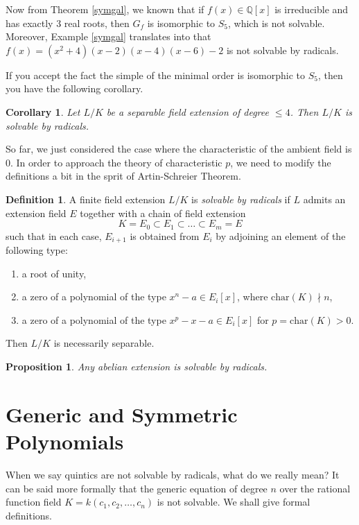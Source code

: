 \documentclass[12pt]{report}
\newtheorem{corollary}[theorem]{Corollary}
\newtheorem{proposition}[theorem]{Proposition}
{\theoremstyle{remark}\newtheorem*{remark}{Remark}}
\theoremstyle{definition}
\newtheorem{definition}[theorem]{Definition}
\newcommand{\qq}{\mathbb{Q}}
\newcommand{\charr}{\text{char}}
\begin{document}
Now from Theorem \ref{symgal}, we known that if $f(x)\in \qq[x]$ is irreducible and has exactly 3 real roots, then $G_f$ is isomorphic to $S_5$, which is not solvable. Moreover, Example \ref{symgal} translates into that $f(x)=(x^2+4)(x-2)(x-4)(x-6)-2$ is not solvable by radicals.

If you accept the fact the simple of the minimal order is isomorphic to $S_5$, then you have the following corollary.

\begin{corollary}
	Let $L/K$ be a separable field extension of degree $\leq 4$. Then $L/K$ is solvable by radicals.
\end{corollary}

So far, we just considered the case where the characteristic of the ambient field is 0. In order to approach the theory of characteristic $p$, we need to modify the definitions a bit in the sprit of Artin-Schreier Theorem.

\begin{definition}
	A finite field extension $L/K$ is \emph{solvable by radicals} if $L$ admits an extension field $E$ together with a chain of field extension
	\[K=E_0\subset E_1\subset \dots\subset E_m=E\]
	such that in each case, $E_{i+1}$ is obtained from $E_i$ by adjoining an element of the following type:
	\begin{enumerate}
		\item a root of unity,
		\item a zero of a polynomial of the type $x^n-a\in E_i[x]$, where $\charr(K)\nmid n$,
		\item a zero of a polynomial of the type $x^p-x-a\in E_i[x]$ for $p=\charr(K)>0$.
	\end{enumerate}
	Then $L/K$ is necessarily separable.
\end{definition}

\begin{proposition}
	Any abelian extension is solvable by radicals.
\end{proposition}


\section{Generic and Symmetric Polynomials}
When we say quintics are not solvable by radicals, what do we really mean? It can be said more formally that the generic equation of degree $n$ over the rational function field $K=k(c_1,c_2,\dots,c_n)$ is not solvable. We shall give formal definitions.
\end{document}
